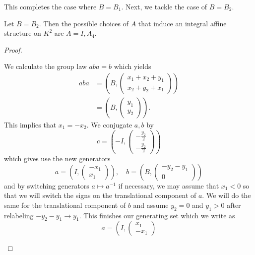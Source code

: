 This completes the case where $B = B_1$. Next, we tackle the case of $B = B_2$.
\begin{lemma}
    Let $B = B_2$. Then the possible choices of $A$ that induce an integral affine structure on $K^2$ are
    $A=I, A_4$.
\end{lemma}
\begin{proof}
    \begin{case}[$A=I$, $B=B_2$]
        We calculate the group law $aba = b$ which yields
        \begin{align*}
            aba & = \left(B, \begin{pmatrix}
                                 x_1 +x_2 +y_1 \\ x_2 + y_2 + x_1
                             \end{pmatrix}\right) \\
                & = \left(B, \begin{pmatrix}
                                 y_1 \\ y_2
                             \end{pmatrix}\right).
        \end{align*}
        This implies that $x_1 = -x_2$. We conjugate $a,b$ by
        $$
            c = \left(-I, \begin{pmatrix}
                    -\frac{y_2}{2} \\
                    -\frac{y_2}{2}
                \end{pmatrix} \right)
        $$
        which gives use the new generators
        $$
            a = \left(I , \begin{pmatrix}
                    -x_1 \\ x_1
                \end{pmatrix}\right), \quad b =\left(B , \begin{pmatrix}
                    -y_2 -y_1 \\ 0
                \end{pmatrix}\right)
        $$
        and by switching generators $a \mapsto a^{-1}$ if necessary, we may assume that $x_1<0$ so that we will switch the signs on the translational component of $a$.
        We will do the same for the translational component of $b$ and assume $y_2 = 0$ and $y_1>0$ after relabeling $-y_2 -y_1 \to y_1$. This finishes our generating set which we write as
        $$
            a = \left(I , \begin{pmatrix}
                    x_1 \\ -x_1

\end{pmatrix}$$
\end{case}
\end{proof}
